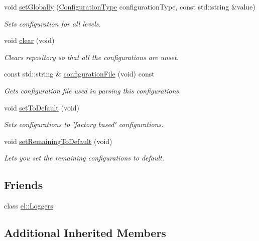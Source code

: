 \begin{DoxyCompactItemize}
\item 
void \hyperlink{classel_1_1_configurations_a56c82c15ea39cc230a5c85ec2c41cbfd}{set\+Globally} (\hyperlink{namespaceel_a281f5db6d6163678bc68a8b23b59e124}{Configuration\+Type} configuration\+Type, const std\+::string \&value)
\begin{DoxyCompactList}\small\item\em Sets configuration for all levels. \end{DoxyCompactList}\item 
void \hyperlink{classel_1_1_configurations_a2a13be6154439286a68d2eccf8417edf}{clear} (void)
\begin{DoxyCompactList}\small\item\em Clears repository so that all the configurations are unset. \end{DoxyCompactList}\item 
const std\+::string \& \hyperlink{classel_1_1_configurations_a18df64bb5cd97bee672160290133141c}{configuration\+File} (void) const 
\begin{DoxyCompactList}\small\item\em Gets configuration file used in parsing this configurations. \end{DoxyCompactList}\item 
void \hyperlink{classel_1_1_configurations_ab34fa2ed4ac77f47b41e464c2d186239}{set\+To\+Default} (void)
\begin{DoxyCompactList}\small\item\em Sets configurations to \char`\"{}factory based\char`\"{} configurations. \end{DoxyCompactList}\item 
void \hyperlink{classel_1_1_configurations_ad89b7d2dd750e4d1b3deff800e278fdb}{set\+Remaining\+To\+Default} (void)
\begin{DoxyCompactList}\small\item\em Lets you set the remaining configurations to default. \end{DoxyCompactList}\end{DoxyCompactItemize}
\subsection*{Friends}
\begin{DoxyCompactItemize}
\item 
class \hyperlink{classel_1_1_configurations_a6efe246b312d02731fb0e1d120c0331d}{el\+::\+Loggers}
\end{DoxyCompactItemize}
\subsection*{Additional Inherited Members}


